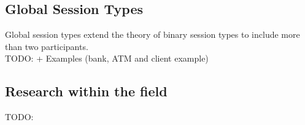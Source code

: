 \subsection{Global Session Types}
Global session types extend the theory of binary session types to include more than two participants. \\
TODO:  + Examples (bank, ATM and client example)

\subsection{Research within the field}
TODO: \\



\iffalse
Maybe Sections instead: \\
 - Behavioural Types \\
 - Session Types \\
 - Examples of global types \\ \\
 \fi